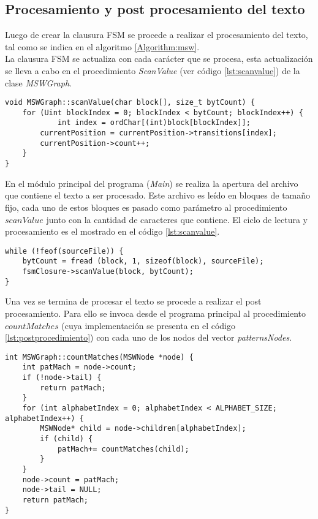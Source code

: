 \subsection{Procesamiento y post procesamiento del texto}
Luego de crear la clausura FSM se procede a realizar el procesamiento del texto, tal como se indica en el algoritmo \ref{Algorithm:msw}. \\
La clausura FSM se actualiza con cada carácter que se procesa, esta actualización se lleva a cabo en el procedimiento {\it ScanValue} (ver código \ref{lst:scanvalue}) de la clase \emph{MSWGraph}.
\begin{lstlisting}[caption=Procedimiento ScanValue, label={lst:scanvalue}]
void MSWGraph::scanValue(char block[], size_t bytCount) {
    for (Uint blockIndex = 0; blockIndex < bytCount; blockIndex++) {
    		int index = ordChar[(int)block[blockIndex]];
        currentPosition = currentPosition->transitions[index];
        currentPosition->count++;
    }
}
\end{lstlisting}
En el módulo principal del programa (\emph{Main}) se realiza la apertura del archivo que contiene el texto a ser procesado. Este archivo es leído en bloques de tamaño fijo, cada uno de estos bloques es pasado como parámetro al procedimiento $scanValue$ junto con la cantidad de caracteres que contiene. El ciclo de lectura y procesamiento es el mostrado en el código \ref{lst:scanvalue}.
\begin{lstlisting}[caption=Procesamiento del texto, label={lst:scanvalue}]
while (!feof(sourceFile)) {
	bytCount = fread (block, 1, sizeof(block), sourceFile);
	fsmClosure->scanValue(block, bytCount);
}
\end{lstlisting}
Una vez se termina de procesar el texto se procede a realizar el post procesamiento. Para ello se invoca desde el programa principal al procedimiento $countMatches$ (cuya implementación se presenta en el código \ref{lst:postprocedimiento}) con cada uno de los nodos del vector {\it patternsNodes}.
 \begin{lstlisting}[caption=Post procesamiento ($countMatches$), label={lst:postprocedimiento}]
int MSWGraph::countMatches(MSWNode *node) {
    int patMach = node->count;
    if (!node->tail) {
        return patMach;
    }
    for (int alphabetIndex = 0; alphabetIndex < ALPHABET_SIZE; alphabetIndex++) {
		MSWNode* child = node->children[alphabetIndex];
		if (child) {
			patMach+= countMatches(child);
		}
	}
    node->count = patMach;
    node->tail = NULL;
    return patMach;
}
\end{lstlisting}
